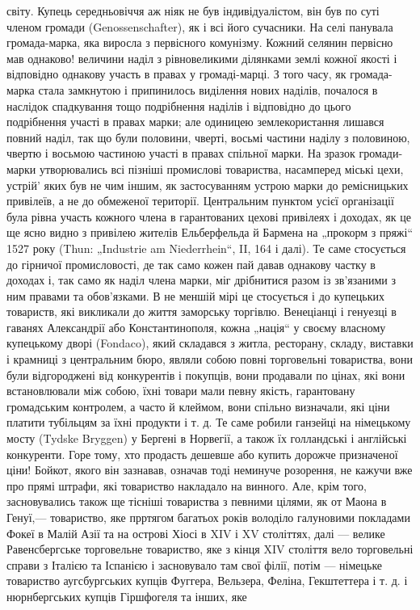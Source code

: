 \parcont{}  %
світу. Купець середньовіччя аж ніяк не був індивідуалістом, він був по суті членом громади (Genossenschafter), як і всі його
сучасники. На селі панувала громада-марка, яка виросла з первісного комунізму. Кожний селянин первісно мав однаково!
величини наділ з рівновеликими ділянками землі кожної якості і відповідно однакову участь в правах у громаді-марці. З того
часу, як громада-марка стала замкнутою і припинилось виділення нових наділів, почалося в наслідок спадкування тощо
подрібнення наділів і відповідно до цього подрібнення участі в правах марки; але одиницею землекористання лишався повний
наділ, так що були половини, чверті, восьмі частини наділу з половиною, чвертю і восьмою частиною участі в правах спільної
марки. На зразок громади-марки утворювались всі пізніші промислові товариства, насамперед міські цехи, устрій'
яких був не чим іншим, як застосуванням устрою марки до ремісницьких привілеїв, а не до обмеженої території. Центральним
пунктом усієї організації була рівна участь кожного члена в гарантованих цехові привілеях і доходах, як це ще ясно видно з
привілею жителів Ельберфельда й Бармена на „прокорм з пряжі“ 1527 року (Thun: „Industrie am Niederrhein“,  II, 164 і далі).
Те саме стосується до гірничої промисловості, де так само кожен пай давав однакову частку в доходах і, так само як наділ
члена марки, міг дрібнитися разом із зв’язаними з ним правами та обов’язками. В не меншій мірі це стосується і до купецьких
товариств, які викликали до життя заморську торгівлю. Венеціанці і генуезці в гаванях Александрії або Константинополя, кожна
„нація“ у своєму власному купецькому дворі (Fondaco), який складався з житла, ресторану, складу, виставки і крамниці з
центральним бюро, являли собою повні торговельні товариства, вони були відгороджені від конкурентів і покупців, вони
продавали по цінах, які вони встановлювали між собою, їхні товари мали певну якість, гарантовану громадським контролем, а
часто й клеймом, вони спільно визначали, які ціни платити тубільцям за їхні продукти і т. д. Те саме робили ганзейці на
німецькому мосту (Tydske Bryggen) у Бергені в Норвегії, а також їх голландські і англійські конкуренти. Горе тому, хто
продасть дешевше або купить дорожче призначеної ціни! Бойкот, якого він зазнавав, означав тоді неминуче розорення, не кажучи
вже про прямі штрафи, які товариство накладало на винного. Але, крім того, засновувались також ще тісніші товариства з
певними цілями, як от Маона в Генуї,—  товариство, яке прртягом багатьох років володіло галуновими покладами Фокеї в Малій
Азії та на острові Хіосі в XIV і XV  століттях, далі — велике Равенсбергське торговельне товариство, яке з кінця XIV
століття вело торговельні справи з Італією та Іспанією і засновувало там свої філії, потім — німецьке товариство
аугсбургських купців Фуггера, Вельзера, Феліна, Гекштеттера і т. д. і нюрнбергських купців Гіршфогеля та інших, яке
\parbreak{}  %
